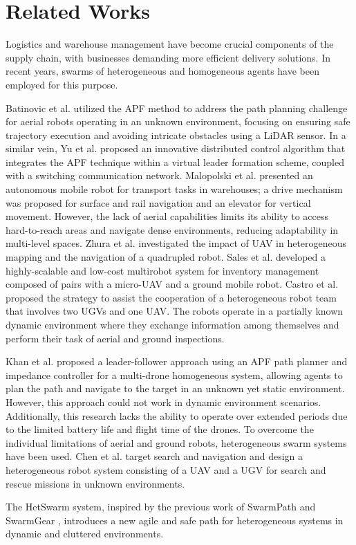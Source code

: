 \section{Related Works}
Logistics and warehouse management have become crucial components of the supply chain, with businesses demanding more efficient delivery solutions. In recent years, swarms of heterogeneous and homogeneous agents have been employed for this purpose. 

Batinovic et al. \cite{APF_LiDAR} utilized the APF method to address the path planning challenge for aerial robots operating in an unknown environment, focusing on ensuring safe trajectory execution and avoiding intricate obstacles using a LiDAR sensor. In a similar vein, Yu et al. \cite{Yu_2023} proposed an innovative distributed control algorithm that integrates the APF technique within a virtual leader formation scheme, coupled with a switching communication network.
Malopolski et al. \cite{GroundRobot} presented an autonomous mobile robot for transport tasks in warehouses; a drive mechanism was proposed for surface and rail navigation and an elevator for vertical movement. However, the lack of aerial capabilities limits its ability to access hard-to-reach areas and navigate dense environments, reducing adaptability in multi-level spaces.
Zhura et al. \cite{Zhura_2023} investigated the impact of UAV in heterogeneous mapping and the navigation of a quadrupled robot. Sales et al. \cite{Sales_2023} developed a highly-scalable and low-cost multirobot system for inventory management composed of pairs with a micro-UAV and a ground mobile robot. Castro et al. \cite{UAV-UGVs} proposed the strategy to assist the cooperation of a heterogeneous robot team that involves two UGVs and one UAV. The robots operate in a partially known dynamic environment where they exchange information among themselves and perform their task of aerial and ground inspections.

Khan et al. \cite{SwarmPath} proposed a leader-follower approach using an APF path planner and impedance controller for a multi-drone homogeneous system, allowing agents to plan the path and navigate to the target in an unknown yet static environment. However, this approach could not work in dynamic environment scenarios. Additionally, this research lacks the ability to operate over extended periods due to the limited battery life and flight time of the drones.
To overcome the individual limitations of aerial and ground robots, heterogeneous swarm systems have been used. Chen et al. \cite{Chen_2025} target search and navigation and design a heterogeneous robot system consisting of a UAV and a UGV for search and rescue missions in unknown environments. 

The HetSwarm system, inspired by the previous work of SwarmPath \cite{SwarmPath} and SwarmGear \cite{SwarmGear}, introduces a new agile and safe path for heterogeneous systems in dynamic and cluttered environments.